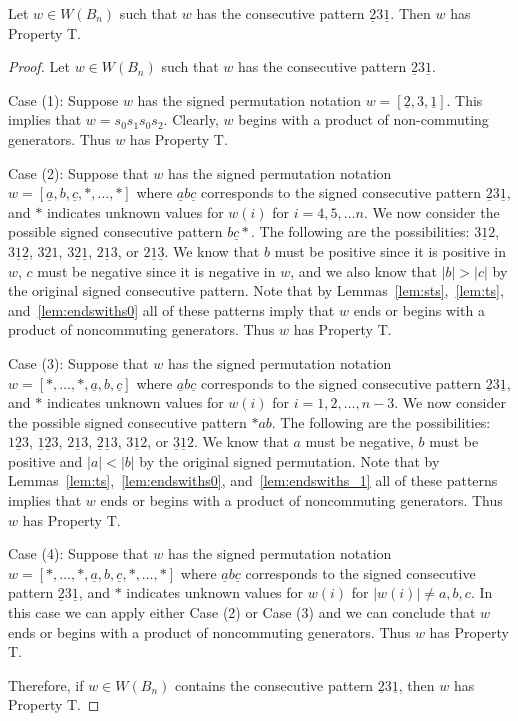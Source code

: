 \begin{lemma}\label{lem:2312}
Let $w \in W(B_n)$ such that $w$ has the consecutive pattern $\underline{2}3\underline{1}$. Then $w$ has Property T.
\begin{proof}
	Let $w \in W(B_n)$ such that $w$ has the consecutive pattern $\underline{2}3\underline{1}$.
	
	Case (1): Suppose $w$ has the signed permutation notation $w=[\underline{2},3,\underline{1}]$. This implies that $w=s_0s_1s_0s_2$. Clearly, $w$ begins with a product of non-commuting generators. Thus $w$ has Property T.
	
	Case (2): Suppose that $w$ has the signed permutation notation $w=[\underline{a},b,\underline{c}, \ast, \ldots, \ast]$ where $\underline{a}b\underline{c}$ corresponds to the signed consecutive pattern $\underline{2}3\underline{1}$, and $\ast$ indicates unknown values for $w(i)$ for $i=4,5, \ldots n$. We now consider the possible signed consecutive pattern $b \underline{c} \ast$. The following are the possibilities: $3\underline{1}2$, $3\underline{1}\underline{2}$, $3\underline{2}1$, $3 \underline{2}\underline{1}$, $2\underline{1}3$, or $2\underline{1}\underline{3}$. We know that $b$ must be positive since it is positive in $w$, $c$ must be negative since it is negative in $w$, and we also know that $|b|>|c|$ by the original signed consecutive pattern. Note that by Lemmas~\ref{lem:sts},~\ref{lem:ts}, and~\ref{lem:endswiths0} all of these patterns imply that $w$ ends or begins with a product of noncommuting generators. Thus $w$ has Property T.
	
	Case (3): Suppose that $w$ has the signed permutation notation $w=[\ast, \ldots, \ast, \underline{a},b,\underline{c}]$ where $\underline{a}b\underline{c}$ corresponds to the signed consecutive pattern $\underline{2}3\underline{1}$, and $\ast$ indicates unknown values for $w(i)$ for $i=1,2, \ldots ,n-3$. We now consider the possible signed consecutive pattern $\ast ab$. The following are the possibilities: $1 \underline{2} 3$, $\underline{1} \underline{2} 3$, $2 \underline{1} 3$, $\underline{2} \underline{1} 3$, $3 \underline{1} 2$, or $\underline{3} \underline{1} 2$. We know that $a$ must be negative, $b$ must be positive and $|a|<|b|$ by the original signed permutation. Note that by Lemmas~\ref{lem:ts},~\ref{lem:endswiths0}, and~\ref{lem:endswiths_1} all of these patterns implies that $w$ ends or begins with a product of noncommuting generators. Thus $w$ has Property T. 

	Case (4): Suppose that $w$ has the signed permutation notation $w=[\ast, \ldots,\ast, \underline{a},b,\underline{c}, \ast, \ldots, \ast]$ where $\underline{a}b\underline{c}$ corresponds to the signed consecutive pattern $\underline{2}3\underline{1}$, and $\ast$ indicates unknown values for $w(i)$ for $|w(i)|\neq a,b,c$. In this case we can apply either Case (2) or Case (3) and we can conclude that $w$ ends or begins with a product of noncommuting generators. Thus $w$ has Property T.

	Therefore, if $w \in W(B_n)$ contains the consecutive pattern $\underline{2}3\underline{1}$, then $w$ has Property T.
\end{proof}	
\end{lemma}


